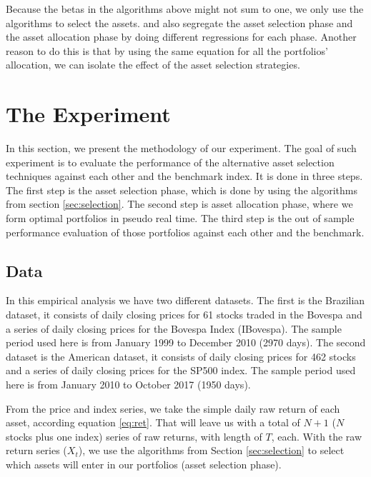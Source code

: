 \documentclass[preprint, doubleblind, authoryear,10pt]{elsarticle}
\begin{document}
Because the betas in the algorithms above might not sum to one, we only use the algorithms to select the assets.
\cite{nnl14} and \cite{nnen14} also segregate the asset selection phase and the asset allocation phase by doing different regressions for each phase.
Another reason to do this is that by using the same equation for all the portfolios' allocation, we can isolate the effect of the asset selection strategies.

\section{The Experiment} \label{sec:experiment}

In this section, we present the methodology of our experiment.
The goal of such experiment is to evaluate the performance of the alternative asset selection techniques against each other and the benchmark index.
It is done in three steps.
The first step is the asset selection phase, which is done by using the algorithms from section \ref{sec:selection}.
The second step is asset allocation phase, where we form optimal portfolios in pseudo real time.
The third step is the out of sample performance evaluation of those portfolios against each other and the benchmark.

\subsection{Data} \label{sec:data}

In this empirical analysis we have two different datasets.
The first is the Brazilian dataset, it consists of daily closing prices for 61 stocks traded in the Bovespa and a series of daily closing prices for the Bovespa Index (IBovespa).
The sample period used here is from January 1999 to December 2010 (2970 days).
The second dataset is the American dataset, it consists of daily closing prices for 462 stocks and a series of daily closing prices for the SP500 index.
The sample period used here is from January 2010 to October 2017 (1950 days).

From the price and index series, we take the simple daily raw return of each asset, according equation \eqref{eq:ret}.
That will leave us with a total of $N+1$ ($N$ stocks plus one index) series of raw returns, with length of $T$, each.
With the raw return series ($X_{t}$), we use the algorithms from Section \ref{sec:selection} to select which assets will enter in our portfolios (asset selection phase).
\end{document}
